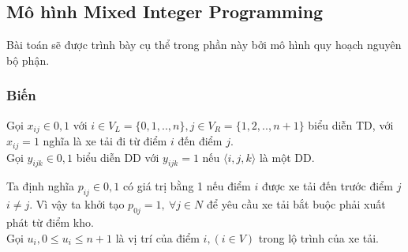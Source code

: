 \documentclass[a4paper,12pt]{report}
\begin{document}
\subsection{Mô hình Mixed Integer Programming }
Bài toán sẽ được trình bày cụ thể trong phần này bởi mô hình quy hoạch nguyên bộ phận.
\subsubsection{Biến}
Gọi $x_{ij} \in {0,1}$ với $i \in V_L= \{0,1,..,n\}, j \in V_R= \{1,2,..,n+1\}$ biểu diễn \ac{TD}, với $x_{ij}=1$ nghĩa là xe tải đi từ điểm $i$ đến điểm $j$.\\

Gọi $y_{ijk} \in {0,1}$ biểu diễn \ac{DD} với $y_{ijk}=1$ nếu $\langle i,j,k \rangle$ là một \ac{DD}.

Ta định nghĩa $p_{ij} \in {0,1}$ có giá trị bằng 1 nếu điểm $i$ được xe tải đến trước điểm $j$ $i \neq j$. Vì vậy ta khởi tạo $p_{0j}=1, \ \forall j \in N$ để yêu cầu xe tải bắt buộc phải xuất phát từ điểm kho. \\

Gọi $u_i, 0\leq u_i \leq n+1$ là vị trí của điểm $i, (i \in V)$ trong lộ trình của xe tải.
\end{document}
